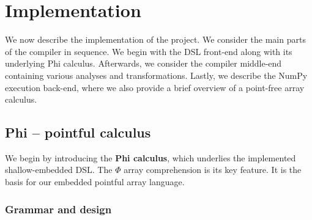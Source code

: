 \chapter{Implementation}

We now describe the implementation of the project. We consider the main parts of the compiler in sequence. We begin with the DSL front-end along with its underlying Phi calculus. Afterwards, we consider the compiler middle-end containing various analyses and transformations. Lastly, we describe the NumPy execution back-end, where we also provide a brief overview of a point-free array calculus.


\section{Phi -- pointful calculus}

We begin by introducing the \textbf{Phi calculus}, which underlies the implemented shallow-embedded DSL. The $\Phi$ array comprehension is its key feature. It is the basis for our embedded pointful array language.

\subsection{Grammar and design}

\newcommand{\philet}[3]{\mathrm{let}\,{#1}={#2}\,\mathrm{in}\,{#3}}
\newcommand{\phivec}[3]{\Phi\, {#1}[{#2}] \ldotp {#3}}
\newcommand{\phifold}[5]{\mathrm{fold}\,{#1}[{#2}]\,\mathrm{over}\,{#3} = {#4}\,\mathrm{by}\,{#5}}
\newcommand{\phipair}[2]{\left\langle {#1}, {#2} \right\rangle}
\newcommand{\phifst}[1]{\mathrm{fst}\,{#1}}
\newcommand{\phisnd}[1]{\mathrm{snd}\,{#1}}
\newcommand{\phisize}[2]{\mathrm{size}_{#2}\, {#1}}
\newcommand{\phiasserteq}[2]{\mathrm{assert}\,{#1}={#2}}

